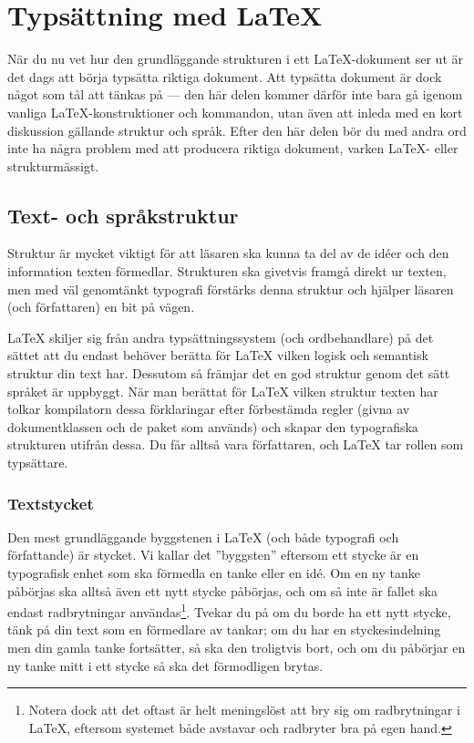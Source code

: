 \documentclass[../../latex.tex]{subfiles}
\begin{document}
\section{Typsättning med \LaTeX}\label{sec:2}
När du nu vet hur den grundläggande strukturen i ett \LaTeX-dokument ser
ut är det dags att börja typsätta riktiga dokument. Att typsätta dokument
är dock något som
tål att tänkas på — den här delen kommer därför inte bara gå igenom
vanliga \LaTeX-konstruktioner och kommandon, utan även att inleda med en
kort diskussion gällande struktur och språk. Efter den här delen bör du
med andra ord inte ha några problem med att producera riktiga dokument,
varken \LaTeX- eller strukturmässigt.

\subsection{Text- och språkstruktur}
Struktur är mycket viktigt för att läsaren ska kunna ta del av de idéer
och den information texten förmedlar. Strukturen ska givetvis framgå
direkt ur texten, men med väl genomtänkt typografi förstärks denna
struktur och hjälper läsaren (och författaren) en bit på vägen.

\LaTeX{} skiljer sig från andra typsättningssystem (och ordbehandlare) på
det sättet att du endast behöver berätta för \LaTeX{} vilken logisk och
semantisk struktur din text har. Dessutom så främjar det en god struktur
genom det sätt språket är uppbyggt. När man berättat för \LaTeX{} vilken
struktur texten har tolkar kompilatorn dessa förklaringar efter
förbestämda regler (givna av dokumentklassen och de paket som används) och
skapar den typografiska strukturen utifrån dessa. Du får alltså vara
författaren, och \LaTeX{} tar rollen som typsättare.

\subsubsection{Textstycket}
Den mest grundläggande byggstenen i \LaTeX{} (och både typografi och 
författande) är stycket. Vi kallar det ”byggsten” eftersom ett stycke är
en typografisk enhet som ska förmedla en tanke eller en idé. Om en ny
tanke påbörjas ska alltså även ett nytt stycke påbörjas, och om så inte är
fallet ska endast radbrytningar användas\footnote{Notera dock att det
oftast är helt meningslöst att bry sig om radbrytningar i \LaTeX, eftersom
systemet både avstavar och radbryter bra på egen hand.}. Tvekar du på om
du borde ha ett nytt stycke, tänk på din text som en förmedlare av tankar;
om du har en styckesindelning men din gamla tanke fortsätter, så ska den
troligtvis bort, och om du påbörjar en ny tanke mitt i ett stycke så ska
det förmodligen brytas.
\end{document}

